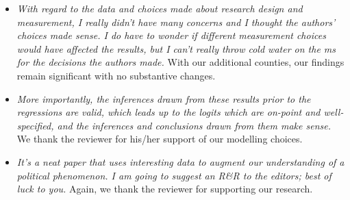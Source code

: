 \documentclass[12pt]{article}
\begin{document}
\begin{itemize}
\item \emph{With regard to the data and choices made about research
    design and measurement, I really didn't have many concerns and I
    thought the authors' choices made sense.  I do have to wonder if
    different measurement choices would have affected the results, but
    I can't really throw cold water on the ms for the decisions the
    authors made.} With our additional counties, our findings remain
  significant with no substantive changes.

\item \emph{More importantly, the inferences drawn from these results
    prior to the regressions are valid, which leads up to the logits
    which are on-point and well-specified, and the inferences and
    conclusions drawn from them make sense.} We thank the reviewer for
  his/her support of our modelling choices.


\item \emph{It's a neat paper that uses interesting data to augment
    our understanding of a political phenomenon. I am going to suggest
    an R\&R to the editors; best of luck to you.}  Again, we thank the
  reviewer for supporting our research.

\end{itemize}
\end{document}
